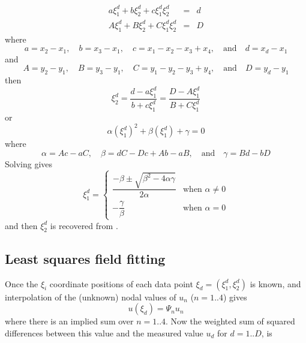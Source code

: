 \begin{equation}
  \begin{array}{rcl}
    a\xi_{1}^{d}+b\xi_{2}^{d}+c\xi_{1}^{d}\xi_{2}^{d}&=&d \\
    A\xi_{1}^{d}+B\xi_{2}^{d}+C\xi_{1}^{d}\xi_{2}^{d}&=&D 
  \end{array}
  \label{eqn:dataxipos1}
\end{equation}
where
\begin{displaymath}
  a=x_{2}-x_{1}, \quad b=x_{3}-x_{1}, \quad c=x_{1}-x_{2}-x_{3}+x_{4}, \quad
  \mbox{and} \quad d=x_{d}-x_{1}
\end{displaymath}
and
\begin{displaymath}
  A=y_{2}-y_{1}, \quad B=y_{3}-y_{1}, \quad C=y_{1}-y_{2}-y_{3}+y_{4}, \quad
  \mbox{and} \quad D=y_{d}-y_{1}
\end{displaymath}
then
\begin{equation}
  \xi_{2}^{d}=\dfrac{d-a\xi_{1}^{d}}{b+c\xi_{1}^{d}}=\dfrac{D-A\xi_{1}^{d}}
  {B+C\xi_{1}^{d}}
  \label{eqn:dataxipos2}
\end{equation}
or
\begin{equation}
  \alpha(\xi_{1}^{d})^{2}+\beta(\xi_{1}^{d})+\gamma=0
  \label{eqn:dataxipos3}
\end{equation}
where
\begin{displaymath}
  \alpha=Ac-aC, \quad \beta=dC-Dc+Ab-aB, \quad \mbox{and} \quad \gamma=Bd-bD
\end{displaymath}
Solving  gives
\begin{equation}
  \xi_{1}^{d}= \left\{ \begin{array}{ll} 
      \dfrac{-\beta\pm\sqrt{\beta^{2}-4\alpha\gamma}}{2\alpha} & 
      \mbox{when } \alpha\neq 0 \\
      -\dfrac{\gamma}{\beta} & \mbox{when } \alpha = 0
    \end{array} \right.
  \label{eqn:dataxipos4}
\end{equation}
and then $\xi_{2}^{d}$ is recovered from .

\subsection{Least squares field fitting}

Once the $\xi_{i}$ coordinate positions of each data point
$\xi_{d}=(\xi_{1}^{d},\xi_{2}^{d})$ is known, and interpolation of the
(unknown) nodal values of $u_{n}$ ($n=1..4$) gives
\begin{displaymath}
  u(\xi_{d})=\Psi_{n}u_{n}
\end{displaymath}
where there is an implied sum over $n=1..4$. Now the weighted sum of squared
differences between this value and the measured value $u_{d}$ for $d=1..D$, is

